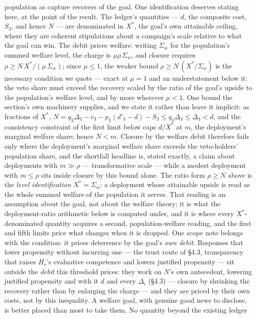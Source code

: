 \documentclass[11pt]{article}
\theoremstyle{definition}
\begin{document}
{population as capture recovers of the goal.} One identification deserves stating here, at the point of the result. The ledger's quantities --- $d$, the composite cost, $S_3$, and hence $N$ --- are denominated in $X^{*}$, the goal's own attainable ceiling, where they are coherent stipulations about a campaign's scale relative to what the goal can win. The debit prices welfare: writing $\Sigma_w$ for the population's summed welfare level, the charge is $\mu\rho\,\Sigma_w$, and closure requires $\rho \geq N\,X^{*}/(\mu\,\Sigma_w)$; since $\mu \leq 1$, the weaker bound $\rho \geq N\,(X^{*}/\Sigma_w)$ is the necessary condition we quote --- exact at $\mu = 1$ and an understatement below it: the veto share must exceed the recovery scaled by the ratio of the goal's upside to the population's welfare level, and by more wherever $\mu < 1$. One bound the section's own machinery supplies, and we state it rather than leave it implicit: as fractions of $X^{*}$, $N = q_3\Delta_3 - c_3 - p_3(d'_3 - d) - S_3 \leq q_3\Delta_3 \leq \Delta_3 < d$, and the consistency constraint of the first limit below caps $d/X^{*}$ at $m$, the deployment's marginal welfare share; hence $N < m$. Closure by the welfare debit therefore fails only where the deployment's marginal welfare share exceeds the veto-holders' population share, and the shortfall headline is, stated exactly, a claim about deployments with $m \gg \rho$ --- transformative scale --- while a modest deployment with $m \leq \rho$ sits inside closure by this bound alone. The ratio form $\rho \geq N$ above is the \emph{level identification} $X^{*} = \Sigma_w$: a deployment whose attainable upside is read as the whole summed welfare of the population it serves. That reading is an assumption about the goal, not about the welfare theory; it is what the deployment-ratio arithmetic below is computed under, and it is where every $X^{*}$-denominated quantity acquires a second, population-welfare reading, and the first and fifth limits price what changes when it is dropped. One scope note belongs with the condition: it prices deterrence by the goal's \emph{own debit}. Responses that lower propensity without incurring one --- the trust route of \S4.3, transparency that raises $H_v$'s evaluative competence and lowers justified propensity --- sit outside the \emph{debit} this threshold prices: they work on $N$'s own antecedent, lowering justified propensity and with it $d$ and every $\Delta_i$ (\S4.3) --- closure by shrinking the recovery rather than by enlarging the charge --- and they are priced by their own costs, not by this inequality. A welfare goal, with genuine good news to disclose, is better placed than most to take them. No quantity beyond the existing ledger
\end{document}

